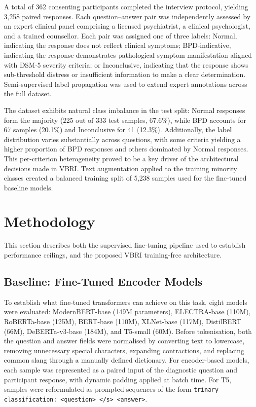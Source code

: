 \documentclass[11pt]{article}
\newcommand{\vbri}{VBRI}
\newcommand{\dsmv}{DSM-5}
\begin{document}
A total of 362 consenting participants completed the interview protocol, yielding 3,258 paired
responses. Each question--answer pair was independently assessed by an expert clinical panel
comprising a licensed psychiatrist, a clinical psychologist, and a trained counsellor. Each pair
was assigned one of three labels: Normal, indicating the response does not reflect clinical
symptoms; BPD-indicative, indicating the response demonstrates pathological symptom
manifestation aligned with \dsmv{} severity criteria; or Inconclusive, indicating that the
response shows sub-threshold distress or insufficient information to make a clear determination.
Semi-supervised label propagation was used to extend expert annotations across the full dataset.

The dataset exhibits natural class imbalance in the test split: Normal responses form the
majority (225 out of 333 test samples, 67.6\%), while BPD accounts for 67 samples (20.1\%) and
Inconclusive for 41 (12.3\%). Additionally, the label distribution varies substantially across
questions, with some criteria yielding a higher proportion of BPD responses and others dominated
by Normal responses. This per-criterion heterogeneity proved to be a key driver of the
architectural decisions made in \vbri{}. Text augmentation applied to the training minority
classes created a balanced training split of 5,238 samples used for the fine-tuned baseline
models.

\section{Methodology}\label{sec:method}

This section describes both the supervised fine-tuning pipeline used to establish performance
ceilings, and the proposed \vbri{} training-free architecture.

\subsection{Baseline: Fine-Tuned Encoder Models}

To establish what fine-tuned transformers can achieve on this task, eight models were evaluated:
ModernBERT-base (149M parameters), ELECTRA-base (110M), RoBERTa-base (125M), BERT-base (110M),
XLNet-base (117M), DistilBERT (66M), DeBERTa-v3-base (184M), and T5-small (60M). Before
tokenisation, both the question and answer fields were normalised by converting text to
lowercase, removing unnecessary special characters, expanding contractions, and replacing common
slang through a manually defined dictionary. For encoder-based models, each sample was
represented as a paired input of the diagnostic question and participant response, with dynamic
padding applied at batch time. For T5, samples were reformulated as prompted sequences of the
form \texttt{trinary classification: <question> </s> <answer>}.
\end{document}

